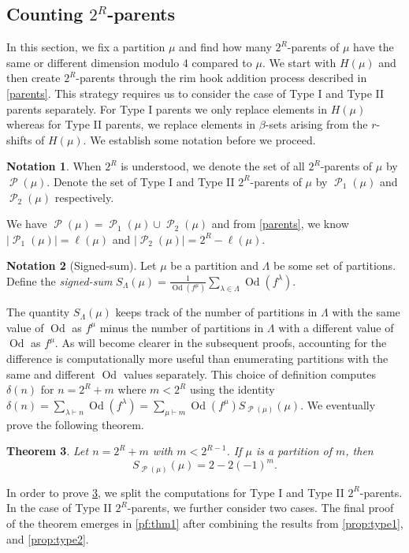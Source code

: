 \documentclass[12pt]{amsart}
\newtheorem{theorem}{Theorem}[section]
\theoremstyle{definition}
\newtheorem{notation}[theorem]{Notation}
\numberwithin{equation}{section}
\newcommand{\la}{\lambda}
\DeclareMathOperator{\p}{\mathcal{P}}
\DeclareMathOperator{\Od}{Od}
\begin{document}
\subsection[Counting 2R parents]{Counting $2^R$-parents}\label{ssec:counting-2R-parents}
In this section, we fix a partition $\mu$ and find how many $2^R$-parents of $\mu$ have the same or different dimension modulo 4 compared to $\mu$. We start with $H(\mu)$ and then create $2^R$-parents through the rim hook addition process described in \cref{parents}. This strategy requires us to consider the case of Type I and Type II parents separately. For Type I parents we only replace elements in $H(\mu)$ whereas for Type II parents, we replace elements in $\beta$-sets arising from the $r$-shifts of $H(\mu)$. We establish some notation before we proceed.
\begin{notation}\label{notn:parents}
When $2^R$ is understood, we denote the set of all $2^R$-parents of $\mu$ by $\p(\mu)$. Denote the set of Type I and Type II $2^R$-parents of $\mu$ by $\p_1(\mu)$ and $\p_2(\mu)$ respectively.
\end{notation}
We have $\p(\mu) = \p_1(\mu) \cup \p_2(\mu)$ and from \cref{parents}, we know $|\p_1(\mu)| = \ell(\mu)$ and $|\p_2(\mu)| = 2^R - \ell(\mu)$.
\begin{notation}[Signed-sum]\label{def:signed-sum}
Let $\mu$ be a partition and $\Lambda$ be some set of partitions. Define the \textit{signed-sum} $S_{\Lambda}(\mu) = \frac{1}{\Od(f^\mu)}\sum_{\lambda\in \Lambda} \Od(f^\lambda)$. 
\end{notation}
The quantity $S_{\Lambda}(\mu)$ keeps track of the number of partitions in $\Lambda$ with the same value of $\Od$ as $f^\mu$ minus the number of partitions in $\Lambda$ with a different value of $\Od$ as $f^\mu$. As will become clearer in the subsequent proofs, accounting for the difference is computationally more useful than enumerating partitions with the same and different $\Od$ values separately. This choice of definition computes $\delta(n)$ for $n = 2^R + m$ where $m < 2^R$ using the identity $\delta(n) = \sum\limits_{\la\vdash n} \Od(f^\la)  =\sum\limits_{\mu\vdash m} \Od(f^\mu) S_{\p(\mu)}(\mu)$. We eventually prove the following theorem.
\begin{theorem}\label{thm:parent-sum}
    Let $n = 2^{R}+m$ with $m < 2^{R-1}$. If $\mu$ is a partition of $m$, then \[S_{\p(\mu)}(\mu) = 2 - 2(-1)^m.\]
\end{theorem}

In order to prove \cref{thm:parent-sum}, we split the computations for Type I and Type II $2^R$-parents. In the case of Type II $2^R$-parents, we further consider two cases. The final proof of the theorem emerges in \cref{pf:thm1} after combining the results from \cref{prop:type1}, and \cref{prop:type2}.
\end{document}
